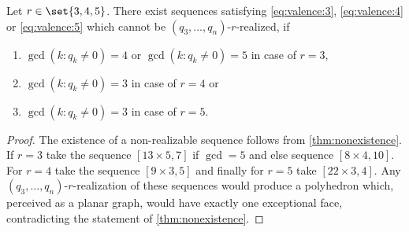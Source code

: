 \begin{corollary}
  Let $r \in \set{3, 4, 5}$. There exist sequences satisfying \autoref{eq:valence:3}, \autoref{eq:valence:4} or \autoref{eq:valence:5} which cannot be $(q_3, \dots, q_n)$-$r$-realized, if 
  \begin{enumerate}[label=(\roman*)]
    \item $\gcd (k : q_k \neq 0) = 4$ or $\gcd (k : q_k \neq 0) = 5$ in case of $r = 3$, 
    \item $\gcd (k : q_k \neq 0) = 3$ in case of $r = 4$ or 
    \item $\gcd (k : q_k \neq 0) = 3$ in case of $r = 5$. 
  \end{enumerate}
  \begin{proof}
The existence of a non-realizable sequence follows from \autoref{thm:nonexistence}. If $r=3$ take the sequence $[13 \times 5, 7]$ if $\gcd = 5$ and else sequence $[8 \times 4, 10]$. For $r=4$ take the sequence $[9 \times 3, 5]$ and finally for $r=5$ take $[22 \times 3, 4]$. Any $(q_3, \dots, q_n)$-$r$-realization of these sequences would produce a polyhedron which, perceived as a planar graph, would have exactly one exceptional face, contradicting the statement of \autoref{thm:nonexistence}.
  \end{proof}
\end{corollary}
